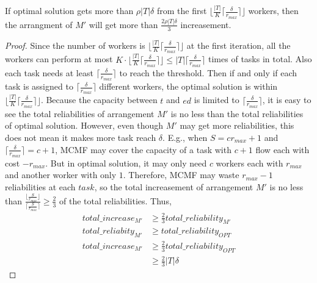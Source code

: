 \begin{lemma}
\label{lem:optFinish}
If optimal solution gets more than $\rho |T|\delta$ 
from the first $\lfloor \frac{|T|}{K}\lceil \frac{\delta}{r_{max}} \rceil \rfloor$ workers,
then the arrangment of $M'$ will get more than $\frac{2\rho|T|\delta}{3}$ increasement.
\end{lemma}
\begin{proof}
Since the number of workers is $\lfloor \frac{|T|}{K}\lceil \frac{\delta}{r_{max}} \rceil \rfloor$ at the first iteration,
all the workers can perform at most $K \cdot \lfloor \frac{|T|}{K}\lceil \frac{\delta}{r_{max}} \rceil \rfloor \le |T|\lceil \frac{\delta}{r_{max}} \rceil$ times of tasks in total.
Also each task needs at least $\lceil \frac{\delta}{r_{max}} \rceil$ to reach the threshold.
Then if and only if each task is assigned to $\lceil \frac{\delta}{r_{max}} \rceil$ different workers,
the optimal solution is within $\lfloor \frac{|T|}{K}\lceil \frac{\delta}{r_{max}} \rceil \rfloor$.
Because the capacity between $t$ and $ed$ is limited to $\lceil \frac{\delta}{r_{max}} \rceil$,
it is easy to see the total reliabilities of arrangement $M'$ is no less than the total reliabilities of optimal solution. 
However, even though $M'$ may get more reliabilities, this does not mean it makes more task reach $\delta$.
E.g., when $S = cr_{max} +1$ and $\lceil \frac{\delta}{r_{max}} \rceil = c + 1$, 
MCMF may cover the capacity of a task with $c+1$ flow each with cost $-r_{max}$.
But in optimal solution, it may only need $c$ workers each with $r_{max}$ and another worker with only $1$.
Therefore, MCMF may waste $r_{max} - 1$ reliabilities at each $task$,
so the total increasement of arrangement $M'$ is no less than 
$\frac{\lfloor \frac{S}{r_{max}} \rfloor}{\lceil \frac{S}{r_{max}} \rceil} \ge \frac{2}{3}$ of the total reliabilities.
Thus,
\begin{align*}
	total\_increase_{M'} &\ge \frac{2}{3} total\_reliability_{M'} \\
	total\_reliabity_{M'} &\ge total\_reliability_{OPT} \\
	total\_increase_{M'} &\ge \frac{2}{3} total\_reliability_{OPT} \\
						&\ge \frac{2}{3} |T|\delta
\end{align*}
\end{proof}

